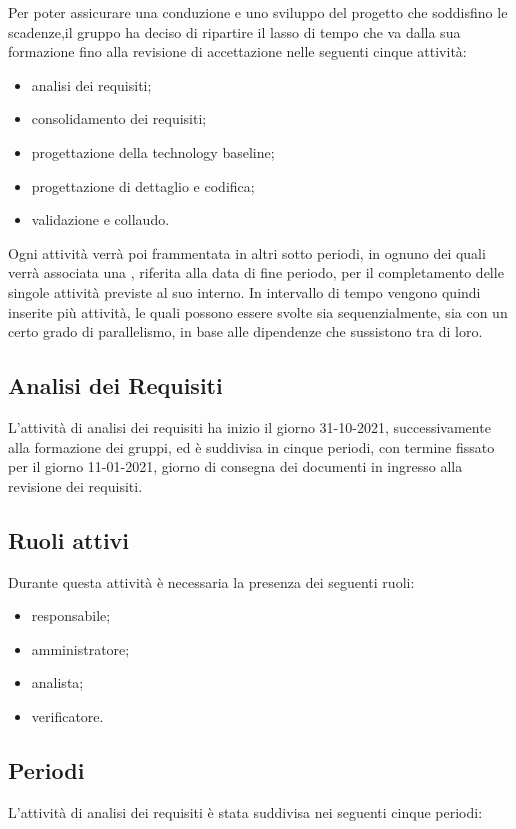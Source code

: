 Per poter assicurare una conduzione e uno sviluppo del progetto che soddisfino le scadenze,il gruppo ha deciso di ripartire il lasso di tempo che va dalla sua formazione fino alla revisione di accettazione nelle seguenti cinque attività:
	
	\begin{itemize}
		\item analisi dei requisiti;
		\item consolidamento dei requisiti;
		\item progettazione della technology baseline;
		\item progettazione di dettaglio e codifica;
		\item validazione e collaudo.
	\end{itemize}	
	Ogni attività verrà poi frammentata in altri sotto periodi, in ognuno dei quali verrà associata una ,
	riferita alla data di fine periodo, per il completamento delle singole attività previste al suo interno.
	In intervallo di tempo vengono quindi inserite più attività, le quali possono essere svolte sia sequenzialmente,
	sia con un certo grado di parallelismo, in base alle dipendenze che sussistono tra di loro.
	
	\subsection{Analisi dei Requisiti}
	L’attività di analisi dei requisiti ha inizio il giorno 31-10-2021, successivamente alla formazione dei
	gruppi, ed è suddivisa in cinque periodi, con termine fissato per il giorno 11-01-2021, giorno di consegna dei documenti in ingresso alla revisione dei requisiti.
	
	\subsection{Ruoli attivi}
	Durante questa attività è necessaria la presenza dei seguenti ruoli:
	\begin{itemize}
		\item responsabile;
		\item amministratore;
		\item analista;
		\item verificatore.
	\end{itemize}

	\subsection{Periodi}
	L'attività di analisi dei requisiti è stata suddivisa nei seguenti cinque periodi:
	
